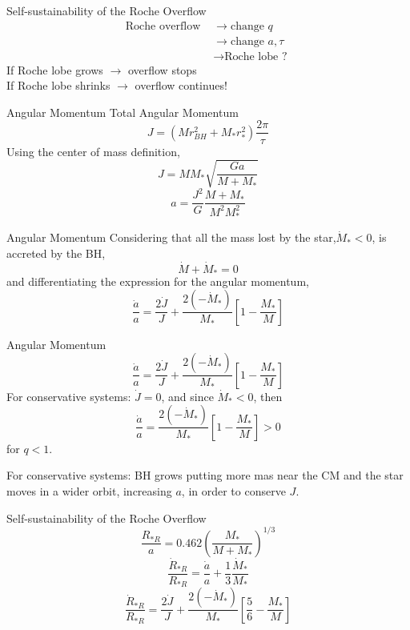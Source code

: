 \documentclass{beamer}
\begin{document}
\begin{frame}{Self-sustainability of the Roche Overflow}
	\begin{align*}
	 \textrm{Roche overflow } &\longrightarrow  \textrm{change } q\\
	 	&\longrightarrow  \textrm{change } a,\tau\\
	 	&\longrightarrow  \textrm{Roche lobe ? }
	 \end{align*}
	 \pause
	 If Roche lobe grows $\longrightarrow$ overflow stops\\
	 
	 \pause
	 If Roche lobe shrinks $\longrightarrow$ overflow continues!	
\end{frame}

\begin{frame}{Angular Momentum}
	Total Angular Momentum 
	\[J = \left( Mr_{BH}^2 + M_* r_*^2\right) \frac{2\pi}{\tau} \]
	\pause
 	Using the center of mass definition,
 	\pause
	\[J = MM_* \sqrt{\frac{Ga}{M + M_*}} \]
	\pause
	\[ a = \frac{J^2}{G} \frac{M + M_*}{M^2 M_*^2}\]	
\end{frame}

\begin{frame}{Angular Momentum}
	Considering that all the mass lost by the star,$ \dot{M}_* < 0$, is accreted by the BH, 
	\[\dot{M} + \dot{M}_* = 0 \]
	\pause
 	and differentiating  the expression for the angular momentum,
 	\pause
	\[ \frac{\dot{a}}{a} = \frac{2\dot{J}}{J} + \frac{2 (- \dot{M}_*)}{M_*} \left[ 1 - \frac{M_*}{M}\right]\]	
\end{frame}

\begin{frame}{Angular Momentum}
	\[ \frac{\dot{a}}{a} = \frac{2\dot{J}}{J} + \frac{2 (- \dot{M}_*)}{M_*} \left[ 1 - \frac{M_*}{M}\right]\]	
	For conservative systems: $\dot{J}=0$, and since $ \dot{M}_* < 0$, then
	\pause
	\[ \frac{\dot{a}}{a} = \frac{2 (- \dot{M}_*)}{M_*} \left[ 1 - \frac{M_*}{M}\right] > 0 \]
	for $q<1$.\\
	\pause
	
	For conservative systems: BH grows putting more mas near the CM and the star moves in a wider orbit, increasing $a$, in order to conserve $J$.
\end{frame}

\begin{frame}{Self-sustainability of the Roche Overflow}
	\[ \frac{R_{*R}}{a} = 0.462 \left( \frac{M_*}{M + M_*} \right) ^{1/3}\]
	\pause
	\[ \frac{\dot{R}_{*R}}{R_{*R}} = \frac{\dot{a}}{a} + \frac{1}{3} \frac{\dot{M}_*}{M_*} \]
	\pause
	\[ \frac{\dot{R}_{*R}}{R_{*R}} = \frac{2\dot{J}}{J} + \frac{2 (- \dot{M}_*)}{M_*} \left[ \frac{5}{6} - \frac{M_*}{M}\right]\]
\end{frame}
\end{document}
